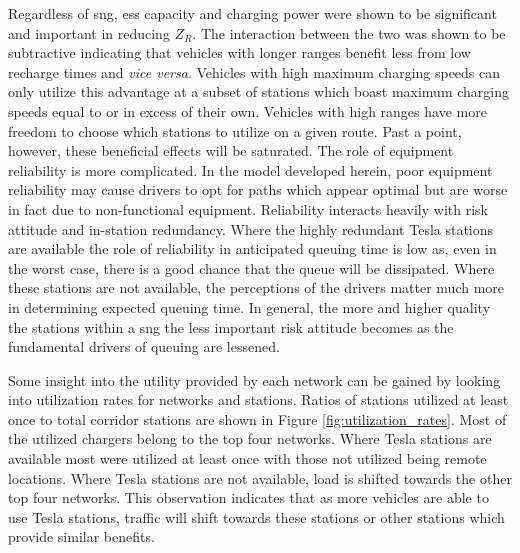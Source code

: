 \begin{multicols}{2}

Regardless of \gls{sng}, \gls{ess} capacity and charging power were shown to be significant and important in reducing $Z_R$. The interaction between the two was shown to be subtractive indicating that vehicles with longer ranges benefit less from low recharge times and \textit{vice versa}. Vehicles with high maximum charging speeds can only utilize this advantage at a subset of stations which boast maximum charging speeds equal to or in excess of their own. Vehicles with high ranges have more freedom to choose which stations to utilize on a given route. Past a point, however, these beneficial effects will be saturated. The role of equipment reliability is more complicated. In the model developed herein, poor equipment reliability may cause drivers to opt for paths which appear optimal but are worse in fact due to non-functional equipment. Reliability interacts heavily with risk attitude and in-station redundancy. Where the highly redundant Tesla stations are available the role of reliability in anticipated queuing time is low as, even in the worst case, there is a good chance that the queue will be dissipated. Where these stations are not available, the perceptions of the drivers matter much more in determining expected queuing time. In general, the more and higher quality the stations within a \gls{sng} the less important risk attitude becomes as the fundamental drivers of queuing are lessened. 
	
Some insight into the utility provided by each network can be gained by looking into utilization rates for networks and stations. Ratios of stations utilized at least once to total corridor stations are shown in Figure \ref{fig:utilization_rates}. Most of the utilized chargers belong to the top four networks. Where Tesla stations are available most were utilized at least once with those not utilized being remote locations. Where Tesla stations are not available, load is shifted towards the other top four networks. This observation indicates that as more vehicles are able to use Tesla stations, traffic will shift towards these stations or other stations which provide similar benefits.

\end{multicols}

